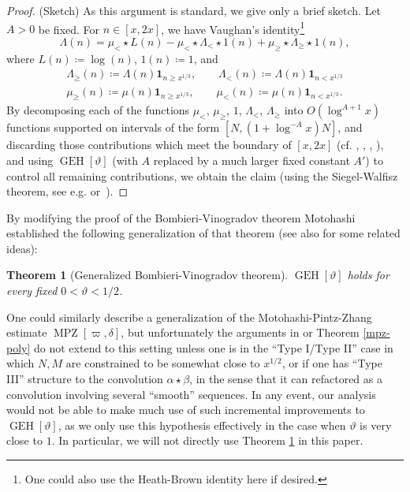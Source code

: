 \documentclass{bmcart}
\DeclareMathOperator*\GEH{GEH}
\DeclareMathOperator*\MPZ{MPZ}
\theoremstyle{plain}
\newtheorem{theorem}{Theorem}[section]
\theoremstyle{definition}
\newcommand{\onef}{\mathbf{1}}
\begin{document}
\begin{proof} (Sketch)  As this argument is standard, we give only a brief sketch.
Let $A > 0$ be fixed.  For $n \in [x,2x]$, we have Vaughan's identity\footnote{One could also use the Heath-Brown identity \cite{hb-ident} here if desired.} \cite{vaughan}
$$ \Lambda(n) = \mu_< \star  L(n) - \mu_< \star  \Lambda_< \star  1(n) + \mu_\geq \star  \Lambda_\geq \star  1(n),$$
where $L(n) \coloneqq \log(n)$, $1(n) \coloneqq 1$, and
\begin{gather}
\Lambda_\geq(n) \coloneqq \Lambda(n) \onef_{n \geq x^{1/3}},\quad\quad 
\Lambda_<(n) \coloneqq \Lambda(n) \onef_{n < x^{1/3}}\\
\mu_\geq(n) \coloneqq \mu(n) \onef_{n \geq x^{1/3}},\quad\quad \mu_<(n) \coloneqq \mu(n)
\onef_{n < x^{1/3}}.
\end{gather}
By decomposing each of the functions $\mu_<$, $\mu_\geq$, $1$, $\Lambda_<$, $\Lambda_{\geq}$ into $O(\log^{A+1} x)$ functions supported on intervals of the form $[N, (1+\log^{-A} x) N]$, and discarding those contributions which meet the boundary of $[x,2x]$ (cf. \cite{fouvry}, \cite{fi-2}, \cite{bfi}, \cite{zhang}), and using $\GEH[\vartheta]$ (with $A$ replaced by a much larger fixed constant $A'$) to control all remaining contributions, we obtain the claim (using the Siegel-Walfisz theorem, see e.g. \cite[Satz 4]{siebert}
  or~\cite[Th. 5.29]{ik}).
\end{proof}

By modifying the proof of the Bombieri-Vinogradov theorem Motohashi \cite{motohashi} established the following generalization of that theorem (see also \cite{gallagher} for some related ideas):

\begin{theorem}[Generalized Bombieri-Vinogradov theorem]\label{gbv-thm}\cite{motohashi}  $\GEH[\vartheta]$ holds for every fixed $0 < \vartheta < 1/2$.
\end{theorem}

One could similarly describe a generalization of the Motohashi-Pintz-Zhang estimate $\MPZ[\varpi,\delta]$, but unfortunately the arguments in \cite{zhang} or Theorem \ref{mpz-poly} do not extend to this setting unless one is in the ``Type I/Type II'' case in which $N,M$ are constrained to be somewhat close to $x^{1/2}$, or if one has ``Type III'' structure to the convolution $\alpha \star \beta$, in the sense that it can refactored as a convolution involving several ``smooth'' sequences.  In any event, our analysis would not be able to make much use of such incremental improvements to $\GEH[\vartheta]$, as we only use this hypothesis effectively in the case when $\vartheta$ is very close to $1$.  In particular, we will not directly use Theorem \ref{gbv-thm} in this paper.
\end{document}
